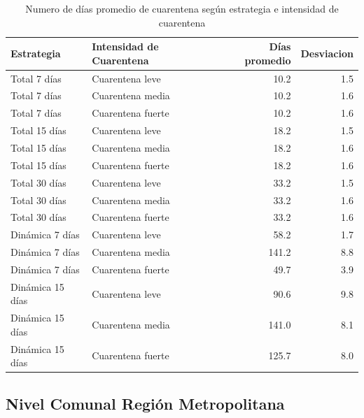 \documentclass[]{article}
\begin{document}
\begin{table}

\caption{\label{tab:DiasCuar}Numero de días promedio de cuarentena según estrategia e intensidad de cuarentena}
\centering
\begin{tabular}[t]{llrr}
\toprule
Estrategia & Intensidad de Cuarentena & Días promedio & Desviacion\\
\midrule
Total 7 días & Cuarentena leve & 10.2 & 1.5\\
Total 7 días & Cuarentena media & 10.2 & 1.6\\
Total 7 días & Cuarentena fuerte & 10.2 & 1.6\\
Total 15 días & Cuarentena leve & 18.2 & 1.5\\
Total 15 días & Cuarentena media & 18.2 & 1.6\\
\addlinespace
Total 15 días & Cuarentena fuerte & 18.2 & 1.6\\
Total 30 días & Cuarentena leve & 33.2 & 1.5\\
Total 30 días & Cuarentena media & 33.2 & 1.6\\
Total 30 días & Cuarentena fuerte & 33.2 & 1.6\\
Dinámica 7 días & Cuarentena leve & 58.2 & 1.7\\
\addlinespace
Dinámica 7 días & Cuarentena media & 141.2 & 8.8\\
Dinámica 7 días & Cuarentena fuerte & 49.7 & 3.9\\
Dinámica 15 días & Cuarentena leve & 90.6 & 9.8\\
Dinámica 15 días & Cuarentena media & 141.0 & 8.1\\
Dinámica 15 días & Cuarentena fuerte & 125.7 & 8.0\\
\bottomrule
\end{tabular}
\end{table}

\hypertarget{nivel-comunal-regiuxf3n-metropolitana}{%
\subsection{Nivel Comunal Región Metropolitana}\label{nivel-comunal-regiuxf3n-metropolitana}}
\end{document}
